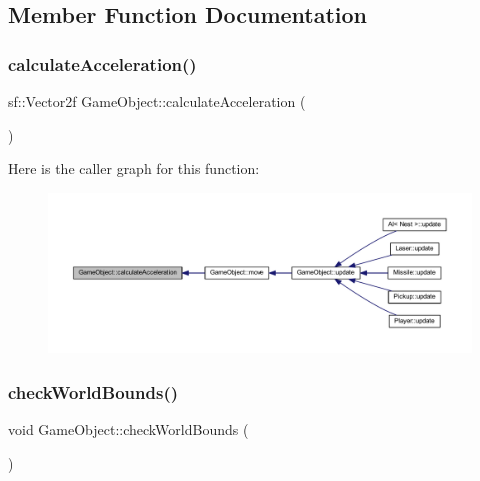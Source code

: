 \subsection{Member Function Documentation}
\mbox{\label{class_game_object_a353ce0e2b43911b153f1b917cefaa45e}} 
\subsubsection{\texorpdfstring{calculate\+Acceleration()}{calculateAcceleration()}}
{\footnotesize\ttfamily sf\+::\+Vector2f Game\+Object\+::calculate\+Acceleration (\begin{DoxyParamCaption}{ }\end{DoxyParamCaption})\hspace{0.3cm}{\ttfamily [protected]}}

Here is the caller graph for this function\+:
\nopagebreak
\begin{figure}[H]
\begin{center}
\leavevmode
\includegraphics[width=350pt]{class_game_object_a353ce0e2b43911b153f1b917cefaa45e_icgraph}
\end{center}
\end{figure}
\mbox{\label{class_game_object_a07bcaf0d87bd507f0a6e98abebd70e53}} 
\subsubsection{\texorpdfstring{check\+World\+Bounds()}{checkWorldBounds()}}
{\footnotesize\ttfamily void Game\+Object\+::check\+World\+Bounds (\begin{DoxyParamCaption}{ }\end{DoxyParamCaption})\hspace{0.3cm}{\ttfamily [virtual]}}



